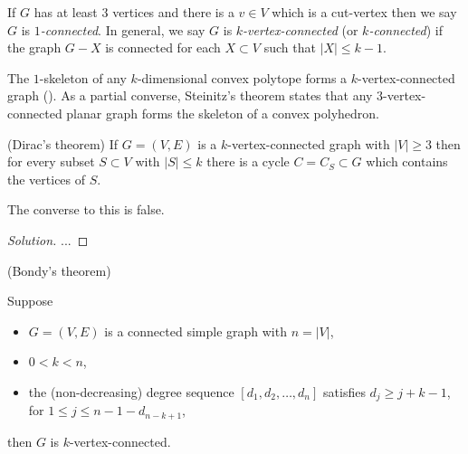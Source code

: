 If $G$ has at least $3$ vertices and there is a $v\in V$
which is a cut-vertex then we say $G$ is {\it $1$-connected}.
 In general, we say $G$ is {\it $k$-vertex-connected} (or
{\it $k$-connected})
if the graph $G-X$ is connected for each $X\subset V$
such that $|X|\leq k-1$.

\begin{example}
The $1$-skeleton of any $k$-dimensional convex polytope forms
a $k$-vertex-connected graph
(\cite{Balinski1961}). As a partial converse, Steinitz's theorem
states that any $3$-vertex-connected planar graph forms
the skeleton of a convex polyhedron.

\end{example}


\begin{theorem}
(Dirac's theorem)
{\rm
If $G=(V,E)$ is a $k$-vertex-connected graph with
$|V|\geq 3$ then for every subset $S\subset V$ with
$|S|\leq k$ there is a cycle $C=C_S\subset G$ which contains
the vertices of $S$.
}
\end{theorem}

The converse to this is false.

\begin{proof}[Solution]
...
\end{proof}


\begin{theorem}
(Bondy's theorem)
{\rm
Suppose

\begin{itemize}
\item
$G=(V,E)$ is a connected simple graph with $n=|V|$,
\item
$0<k<n$,
\item
the (non-decreasing) degree sequence
$[d_1,d_2,\dots, d_n]$ satisfies
$d_j\geq j+k-1$, for $1\leq j\leq n-1-d_{n-k+1}$,
\end{itemize}
then $G$ is $k$-vertex-connected.
}
\end{theorem}

